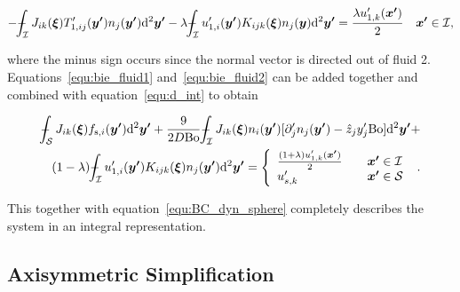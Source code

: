 \documentclass[12pt]{article}
\def\Xint#1{\mathchoice
{\XXint\displaystyle\textstyle{#1}}%
{\XXint\textstyle\scriptstyle{#1}}%
{\XXint\scriptstyle\scriptscriptstyle{#1}}%
{\XXint\scriptscriptstyle\scriptscriptstyle{#1}}%
\!\int}
\def\XXint#1#2#3{{\setbox0=\hbox{$#1{#2#3}{\int}$}
\vcenter{\hbox{$#2#3$}}\kern-.5\wd0}}
\def\dashint{\Xint-}
\begin{document}
\begin{equation}
\label{equ:bie_fluid2}
-\dashint_{\mathcal{I}} J_{ik}(\boldsymbol{\xi}) T'_{1,ij}(\boldsymbol{y'}) n_{j}(\boldsymbol{y'}) \mathrm{d}^{2}\boldsymbol{y'} - \lambda \dashint_{\mathcal{I}} u'_{1,i}(\boldsymbol{y'}) K_{ijk}(\boldsymbol{\xi}) n_{j}(\boldsymbol{y}) \mathrm{d}^{2}\boldsymbol{y'} = \frac{\lambda u'_{1,k}(\boldsymbol{x'})}{2} \quad \boldsymbol{x'} \in \mathcal{I} ,
\end{equation}

where the minus sign occurs since the normal vector is directed out of fluid 2. Equations~\ref{equ:bie_fluid1} and~\ref{equ:bie_fluid2} can be added together and combined with equation~\ref{equ:d_int} to obtain

\begin{align}
\label{equ:I1}
\dashint_{\mathcal{S}} J_{ik}(\boldsymbol{\xi}) f_{\text{s},i}(\boldsymbol{y'}) \mathrm{d}^{2} \boldsymbol{y'} + \frac{9}{2 D \text{Bo}} \dashint_{\mathcal{I}} J_{ik}(\boldsymbol{\xi}) n_{i}(\boldsymbol{y'}) [\partial'_{j} n_{j}(\boldsymbol{y'}) - \hat{z}_{j} y'_{j} \text{Bo}] \mathrm{d}^{2} \boldsymbol{y'} + \nonumber \\
(1 - \lambda) \dashint_{\mathcal{I}} u'_{1,i}(\boldsymbol{y'}) K_{ijk}(\boldsymbol{\xi}) n_{j}(\boldsymbol{y'}) \mathrm{d}^{2}\boldsymbol{y'} = 
\left\{
    \begin{array}{l l}
      \frac{(1 + \lambda) u'_{1,k}(\boldsymbol{x'})}{2} &\quad \boldsymbol{x'} \in \mathcal{I} \\
      u'_{s,k} &\quad \boldsymbol{x'} \in \mathcal{S} 
\end{array}
\right.\ .
\end{align}

This together with equation~\ref{equ:BC_dyn_sphere} completely describes the system in an integral representation. 

\subsection{Axisymmetric Simplification}
\label{subsec:axi_sym}
\end{document}
